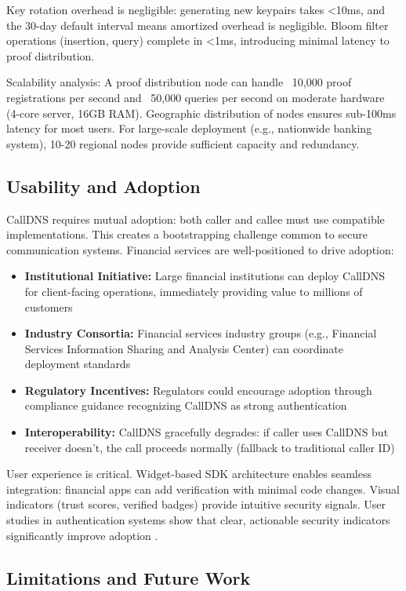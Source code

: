 \documentclass[11pt,twocolumn]{article}
\begin{document}
Key rotation overhead is negligible: generating new keypairs takes <10ms, and the 30-day default interval means amortized overhead is negligible. Bloom filter operations (insertion, query) complete in <1ms, introducing minimal latency to proof distribution.

Scalability analysis: A proof distribution node can handle ~10,000 proof registrations per second and ~50,000 queries per second on moderate hardware (4-core server, 16GB RAM). Geographic distribution of nodes ensures sub-100ms latency for most users. For large-scale deployment (e.g., nationwide banking system), 10-20 regional nodes provide sufficient capacity and redundancy.

\subsection{Usability and Adoption}

CallDNS requires mutual adoption: both caller and callee must use compatible implementations. This creates a bootstrapping challenge common to secure communication systems. Financial services are well-positioned to drive adoption:
\begin{itemize}
\item \textbf{Institutional Initiative:} Large financial institutions can deploy CallDNS for client-facing operations, immediately providing value to millions of customers
\item \textbf{Industry Consortia:} Financial services industry groups (e.g., Financial Services Information Sharing and Analysis Center) can coordinate deployment standards
\item \textbf{Regulatory Incentives:} Regulators could encourage adoption through compliance guidance recognizing CallDNS as strong authentication
\item \textbf{Interoperability:} CallDNS gracefully degrades: if caller uses CallDNS but receiver doesn't, the call proceeds normally (fallback to traditional caller ID)
\end{itemize}

User experience is critical. Widget-based SDK architecture enables seamless integration: financial apps can add verification with minimal code changes. Visual indicators (trust scores, verified badges) provide intuitive security signals. User studies in authentication systems show that clear, actionable security indicators significantly improve adoption \cite{felt2015}.

\subsection{Limitations and Future Work}
\end{document}
